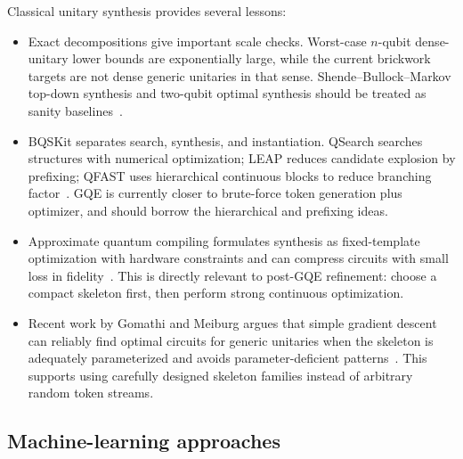 \documentclass[11pt]{article}
\begin{document}
Classical unitary synthesis provides several lessons:
\begin{itemize}
  \item Exact decompositions give important scale checks.  Worst-case
  \(n\)-qubit dense-unitary lower bounds are exponentially large, while the
  current brickwork targets are not dense generic unitaries in that sense.
  Shende--Bullock--Markov top-down synthesis and two-qubit optimal synthesis
  should be treated as sanity baselines~\cite{shende2006synthesis,shende2004minimal}.
  \item BQSKit separates search, synthesis, and instantiation.  QSearch searches
  structures with numerical optimization; LEAP reduces candidate explosion by
  prefixing; QFAST uses hierarchical continuous blocks to reduce branching
  factor~\cite{bqskitdocs,qfast,leap}.  GQE is currently closer to brute-force
  token generation plus optimizer, and should borrow the hierarchical and
  prefixing ideas.
  \item Approximate quantum compiling formulates synthesis as fixed-template
  optimization with hardware constraints and can compress circuits with small
  loss in fidelity~\cite{madden2021aqc,robertson2023aqc}.  This is directly
  relevant to post-GQE refinement: choose a compact skeleton first, then perform
  strong continuous optimization.
  \item Recent work by Gomathi and Meiburg argues that simple gradient descent
  can reliably find optimal circuits for generic unitaries when the skeleton is
  adequately parameterized and avoids parameter-deficient patterns~\cite{gomathi2026gd}.
  This supports using carefully designed skeleton families instead of arbitrary
  random token streams.
\end{itemize}

\subsection{Machine-learning approaches}
\end{document}
